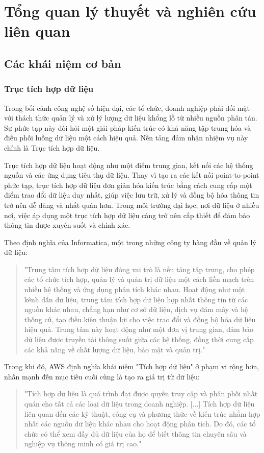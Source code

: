 \chapter{Tổng quan lý thuyết và nghiên cứu liên quan}

\section{Các khái niệm cơ bản}
\subsection{Trục tích hợp dữ liệu}
Trong bối cảnh công nghệ số hiện đại, các tổ chức, doanh nghiệp phải đối mặt với thách thức quản lý và xử lý lượng dữ liệu khổng lồ từ nhiều nguồn phân tán. Sự phức tạp này đòi hỏi một giải pháp kiến trúc có khả năng tập trung hóa và điều phối luồng dữ liệu một cách hiệu quả. Nền tảng đảm nhận nhiệm vụ này chính là Trục tích hợp dữ liệu.

Trục tích hợp dữ liệu hoạt động như một điểm trung gian, kết nối các hệ thống nguồn và các ứng dụng tiêu thụ dữ liệu. Thay vì tạo ra các kết nối point-to-point phức tạp, trục tích hợp dữ liệu đơn giản hóa kiến trúc bằng cách cung cấp một điểm trao đổi dữ liệu duy nhất, giúp việc lưu trữ, xử lý và đồng bộ hóa thông tin trở nên dễ dàng và nhất quán hơn. Trong môi trường đại học, nơi dữ liệu ở nhiều nơi, việc áp dụng một trục tích hợp dữ liệu càng trở nên cấp thiết để đảm bảo thông tin được xuyên suốt và chính xác.

Theo định nghĩa của Informatica, một trong những công ty hàng đầu về quản lý dữ liệu:
\begin{quote}
"Trung tâm tích hợp dữ liệu đóng vai trò là nền tảng tập trung, cho phép các tổ chức tích hợp, quản lý và quản trị dữ liệu một cách liền mạch trên nhiều hệ thống và ứng dụng phân tích khác nhau. Hoạt động như một kênh dẫn dữ liệu, trung tâm tích hợp dữ liệu hợp nhất thông tin từ các nguồn khác nhau, chẳng hạn như cơ sở dữ liệu, dịch vụ đám mây và hệ thống cũ, tạo điều kiện thuận lợi cho việc trao đổi và đồng bộ hóa dữ liệu hiệu quả. Trung tâm này hoạt động như một đơn vị trung gian, đảm bảo dữ liệu được truyền tải thông suốt giữa các hệ thống, đồng thời cung cấp các khả năng về chất lượng dữ liệu, bảo mật và quản trị." \cite{informatica:whatisdih}
\end{quote}

Trong khi đó, AWS định nghĩa khái niệm "Tích hợp dữ liệu" ở phạm vi rộng hơn, nhấn mạnh đến mục tiêu cuối cùng là tạo ra giá trị từ dữ liệu:
\begin{quote}
"Tích hợp dữ liệu là quá trình đạt được quyền truy cập và phân phối nhất quán cho tất cả các loại dữ liệu trong doanh nghiệp. [...] Tích hợp dữ liệu liên quan đến các kỹ thuật, công cụ và phương thức về kiến trúc nhằm hợp nhất các nguồn dữ liệu khác nhau cho hoạt động phân tích. Do đó, các tổ chức có thể xem đầy đủ dữ liệu của họ để biết thông tin chuyên sâu và nghiệp vụ thông minh có giá trị cao." \cite{aws:whatisdi}
\end{quote}

